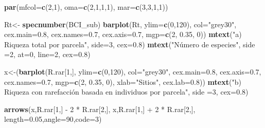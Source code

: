 \documentclass[]{book}
\newenvironment{Shaded}{\begin{snugshade}}{\end{snugshade}}
\newcommand{\KeywordTok}[1]{\textcolor[rgb]{0.13,0.29,0.53}{\textbf{{#1}}}}
\newcommand{\DataTypeTok}[1]{\textcolor[rgb]{0.13,0.29,0.53}{{#1}}}
\newcommand{\DecValTok}[1]{\textcolor[rgb]{0.00,0.00,0.81}{{#1}}}
\newcommand{\FloatTok}[1]{\textcolor[rgb]{0.00,0.00,0.81}{{#1}}}
\newcommand{\StringTok}[1]{\textcolor[rgb]{0.31,0.60,0.02}{{#1}}}
\newcommand{\NormalTok}[1]{{#1}}
\begin{document}
\begin{Shaded}
\begin{Highlighting}[]
\KeywordTok{par}\NormalTok{(}\DataTypeTok{mfcol=}\KeywordTok{c}\NormalTok{(}\DecValTok{2}\NormalTok{,}\DecValTok{1}\NormalTok{), }\DataTypeTok{oma=}\KeywordTok{c}\NormalTok{(}\DecValTok{2}\NormalTok{,}\DecValTok{1}\NormalTok{,}\DecValTok{1}\NormalTok{,}\DecValTok{1}\NormalTok{), }\DataTypeTok{mar=}\KeywordTok{c}\NormalTok{(}\DecValTok{3}\NormalTok{,}\DecValTok{3}\NormalTok{,}\DecValTok{1}\NormalTok{,}\DecValTok{1}\NormalTok{))}

\NormalTok{Rt<-}\StringTok{ }\KeywordTok{specnumber}\NormalTok{(BCI_sub)}
\KeywordTok{barplot}\NormalTok{(Rt, }\DataTypeTok{ylim=}\KeywordTok{c}\NormalTok{(}\DecValTok{0}\NormalTok{,}\DecValTok{120}\NormalTok{), }\DataTypeTok{col=}\StringTok{"grey30"}\NormalTok{, }\DataTypeTok{cex.main=}\FloatTok{0.8}\NormalTok{,}
         \DataTypeTok{cex.names=}\FloatTok{0.7}\NormalTok{, }\DataTypeTok{cex.axis=}\FloatTok{0.7}\NormalTok{, }\DataTypeTok{mgp=}\KeywordTok{c}\NormalTok{(}\DecValTok{2}\NormalTok{, }\FloatTok{0.35}\NormalTok{, }\DecValTok{0}\NormalTok{))}
\KeywordTok{mtext}\NormalTok{(}\StringTok{"a) Riqueza total por parcela"}\NormalTok{, }\DataTypeTok{side=}\DecValTok{3}\NormalTok{, }\DataTypeTok{cex=}\FloatTok{0.8}\NormalTok{)}
\KeywordTok{mtext}\NormalTok{(}\StringTok{"Número de especies"}\NormalTok{, }\DataTypeTok{side =}\DecValTok{2}\NormalTok{, }\DataTypeTok{at=}\DecValTok{0}\NormalTok{, }\DataTypeTok{line=}\DecValTok{2}\NormalTok{, }\DataTypeTok{cex=}\FloatTok{0.8}\NormalTok{)}

\NormalTok{x<-(}\KeywordTok{barplot}\NormalTok{(R.rar[}\DecValTok{1}\NormalTok{,], }\DataTypeTok{ylim=}\KeywordTok{c}\NormalTok{(}\DecValTok{0}\NormalTok{,}\DecValTok{120}\NormalTok{), }\DataTypeTok{col=}\StringTok{"grey30"}\NormalTok{, }
            \DataTypeTok{cex.main=}\FloatTok{0.8}\NormalTok{, }\DataTypeTok{cex.axis=}\FloatTok{0.7}\NormalTok{, }\DataTypeTok{cex.names=}\FloatTok{0.7}\NormalTok{, }\DataTypeTok{mgp=}\KeywordTok{c}\NormalTok{(}\DecValTok{2}\NormalTok{, }\FloatTok{0.35}\NormalTok{, }\DecValTok{0}\NormalTok{), }
            \DataTypeTok{xlab=}\StringTok{"Sitios"}\NormalTok{, }\DataTypeTok{cex.lab=}\FloatTok{0.8}\NormalTok{))}
\KeywordTok{mtext}\NormalTok{(}\StringTok{"b) Riqueza con rarefacción basada en individuos por parcela"}\NormalTok{, }\DataTypeTok{side =}\DecValTok{3}\NormalTok{, }\DataTypeTok{cex=}\FloatTok{0.8}\NormalTok{)}

\KeywordTok{arrows}\NormalTok{(x,R.rar[}\DecValTok{1}\NormalTok{,] -}\StringTok{ }\DecValTok{2} \NormalTok{*}\StringTok{ }\NormalTok{R.rar[}\DecValTok{2}\NormalTok{,], x,R.rar[}\DecValTok{1}\NormalTok{,] +}\StringTok{ }\DecValTok{2} \NormalTok{*}\StringTok{ }\NormalTok{R.rar[}\DecValTok{2}\NormalTok{,], }\DataTypeTok{length=}\FloatTok{0.05}\NormalTok{,}\DataTypeTok{angle=}\DecValTok{90}\NormalTok{,}\DataTypeTok{code=}\DecValTok{3}\NormalTok{)}
\end{Highlighting}
\end{Shaded}
\end{document}
